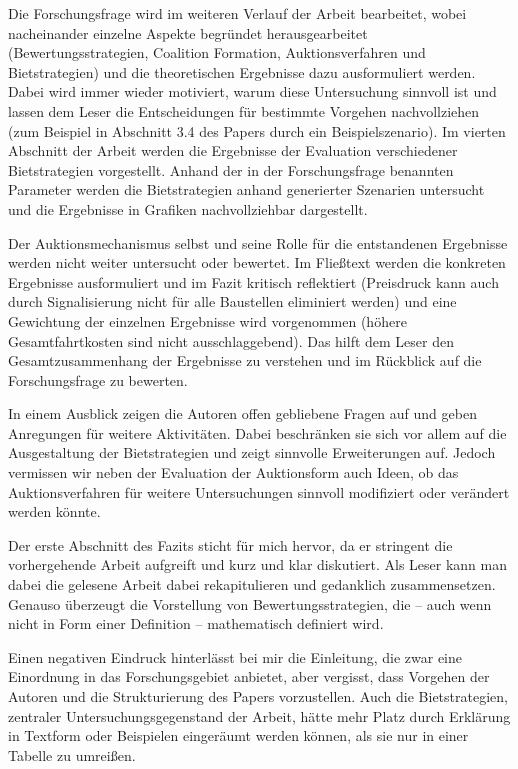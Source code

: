 \documentclass[sigconf]{acmart}
\begin{document}
Die Forschungsfrage wird im weiteren Verlauf der Arbeit bearbeitet, wobei nacheinander einzelne Aspekte begründet herausgearbeitet (Bewertungsstrategien, Coalition Formation, Auktionsverfahren und Bietstrategien) und die theoretischen Ergebnisse dazu ausformuliert werden. Dabei wird immer wieder motiviert, warum diese Untersuchung sinnvoll ist und lassen dem Leser die Entscheidungen für bestimmte Vorgehen nachvollziehen (zum Beispiel in Abschnitt 3.4 des Papers durch ein Beispielszenario). Im vierten Abschnitt der Arbeit werden die Ergebnisse der Evaluation verschiedener Bietstrategien vorgestellt. Anhand der in der Forschungsfrage benannten Parameter werden die Bietstrategien anhand generierter Szenarien untersucht und die Ergebnisse in Grafiken nachvollziehbar dargestellt.

Der Auktionsmechanismus selbst und seine Rolle für die entstandenen Ergebnisse werden nicht weiter untersucht oder bewertet. Im Fließtext werden die konkreten Ergebnisse ausformuliert und im Fazit kritisch reflektiert (Preisdruck kann auch durch Signalisierung nicht für alle Baustellen eliminiert werden) und eine Gewichtung der einzelnen Ergebnisse wird vorgenommen (höhere Gesamtfahrtkosten sind nicht ausschlaggebend). Das hilft dem Leser den Gesamtzusammenhang der Ergebnisse zu verstehen und im Rückblick auf die Forschungsfrage zu bewerten.

In einem Ausblick zeigen die Autoren offen gebliebene Fragen auf und geben Anregungen für weitere Aktivitäten. Dabei beschränken sie sich vor allem auf die Ausgestaltung der Bietstrategien und zeigt sinnvolle Erweiterungen auf. Jedoch vermissen wir neben der Evaluation der Auktionsform auch Ideen, ob das Auktionsverfahren für weitere Untersuchungen sinnvoll modifiziert oder verändert werden könnte.

Der erste Abschnitt des Fazits sticht für mich hervor, da er stringent die vorhergehende Arbeit aufgreift und kurz und klar diskutiert. Als Leser kann man dabei die gelesene Arbeit dabei rekapitulieren und gedanklich zusammensetzen. Genauso überzeugt die Vorstellung von Bewertungsstrategien, die -- auch wenn nicht in Form einer Definition -- mathematisch definiert wird.

Einen negativen Eindruck hinterlässt bei mir die Einleitung, die zwar eine Einordnung in das Forschungsgebiet anbietet, aber vergisst, dass Vorgehen der Autoren und die Strukturierung des Papers vorzustellen. Auch die Bietstrategien, zentraler Untersuchungsgegenstand der Arbeit, hätte mehr Platz durch Erklärung in Textform oder Beispielen eingeräumt werden können, als sie nur in einer Tabelle zu umreißen.
\end{document}
